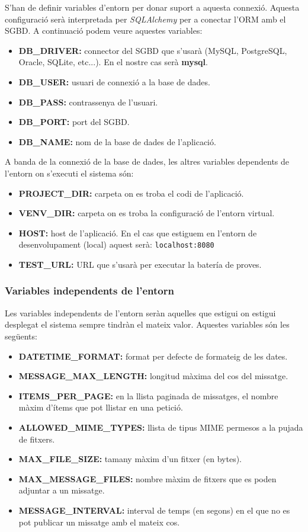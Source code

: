 S'han de definir variables d'entorn per donar suport a aquesta connexió. Aquesta configuració serà interpretada per \emph{SQLAlchemy} per a conectar l'\ac{ORM} amb el \ac{SGBD}. A continuació podem veure aquestes variables:

\begin{itemize}
	\item \textbf{DB\_DRIVER:} connector del \ac{SGBD} que s'usarà (MySQL, PostgreSQL, Oracle, SQLite, etc...). En el nostre cas serà \textbf{mysql}.
	\item \textbf{DB\_USER:} usuari de connexió a la base de dades.
	\item \textbf{DB\_PASS:} contrassenya de l'usuari.
	\item \textbf{DB\_PORT:} port del \ac{SGBD}.
	\item \textbf{DB\_NAME:} nom de la base de dades de l'aplicació.
\end{itemize}

A banda de la connexió de la base de dades, les altres variables dependents de l'entorn on s'executi el sistema són:
\begin{itemize}
	\item \textbf{PROJECT\_DIR:} carpeta on es troba el codi de l'aplicació.
	\item \textbf{VENV\_DIR:} carpeta on es troba la configuració de l'entorn virtual.
	\item \textbf{HOST:} host de l'aplicació. En el cas que estiguem en l'entorn de desenvolupament (local) aquest serà: \texttt{localhost:8080}
	\item \textbf{TEST\_URL:} \ac{URL} que s'usarà per executar la batería de proves.
\end{itemize}

\subsubsection{Variables independents de l'entorn}
Les variables independents de l'entorn seràn aquelles que estigui on estigui desplegat el sistema sempre tindràn el mateix valor. Aquestes variables són les següents:

\begin{itemize}	
	
	\item \textbf{DATETIME\_FORMAT:} format per defecte de formateig de les dates. 
	\item \textbf{MESSAGE\_MAX\_LENGTH:} longitud màxima del cos del missatge.
	\item \textbf{ITEMS\_PER\_PAGE:} en la llista paginada de missatges, el nombre màxim d'ítems que pot llistar en una petició.
	\item \textbf{ALLOWED\_MIME\_TYPES:} llista de tipus \ac{MIME} permesos a la pujada de fitxers.
	\item \textbf{MAX\_FILE\_SIZE:} tamany màxim d'un fitxer (en bytes).
	\item \textbf{MAX\_MESSAGE\_FILES:} nombre màxim de fitxers que es poden adjuntar a un missatge.
	\item \textbf{MESSAGE\_INTERVAL:} interval de temps (en segons) en el que no es pot publicar un missatge amb el mateix cos.
\end{itemize}

